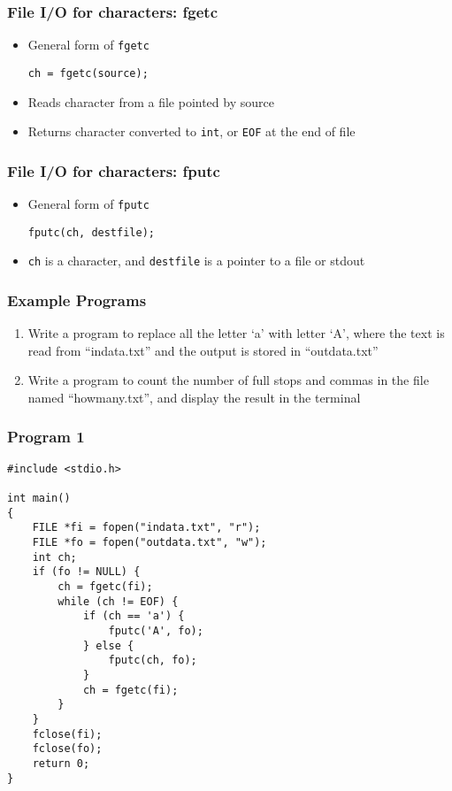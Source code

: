 \documentclass[11pt]{beamer}
\begin{document}
\begin{frame}[fragile]\frametitle{File I/O for characters: fgetc}
\label{sec-1-20}

\begin{itemize}
\item General form of \verb~fgetc~

\begin{verbatim}
ch = fgetc(source);
\end{verbatim}
\item Reads character from a file pointed by source
\item Returns character converted to \verb~int~, or \verb~EOF~ at the end of file
\end{itemize}
\end{frame}
\begin{frame}[fragile]\frametitle{File I/O for characters: fputc}
\label{sec-1-21}

\begin{itemize}
\item General form of \verb~fputc~

\begin{verbatim}
fputc(ch, destfile);
\end{verbatim}
\item \verb~ch~ is a character, and \verb~destfile~ is a pointer to a file or stdout
\end{itemize}
\end{frame}
\begin{frame}[fragile]\frametitle{Example Programs}
\label{sec-1-22}

\begin{enumerate}
\item Write a program to replace all the letter `a' with letter `A', where the text is read from ``indata.txt'' and the output is stored in ``outdata.txt''
\item Write a program to count the number of full stops and commas in the file named ``howmany.txt'', and display the result in the terminal
\end{enumerate}
\end{frame}
\begin{frame}[fragile]\frametitle{Program 1}
\label{sec-1-23}

{\scriptsize 

\begin{verbatim}
#include <stdio.h>

int main()
{
    FILE *fi = fopen("indata.txt", "r");
    FILE *fo = fopen("outdata.txt", "w");
    int ch;
    if (fo != NULL) {
        ch = fgetc(fi);
        while (ch != EOF) {
            if (ch == 'a') {
                fputc('A', fo);
            } else {
                fputc(ch, fo);
            }
            ch = fgetc(fi);
        }
    }
    fclose(fi);
    fclose(fo);
    return 0;
}
\end{verbatim}
}
\end{frame}
\end{document}
